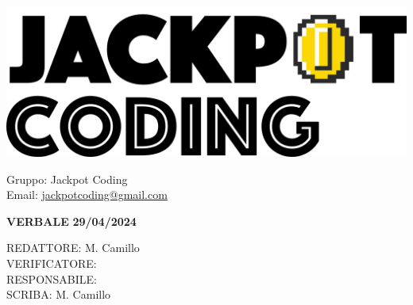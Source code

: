 \documentclass[5pt]{article}
\begin{document}
\begin{minipage}[t]{0.50\textwidth}
    \begin{flushleft}
        \hspace{10pt}
        \includegraphics[scale=0.65]{jackpot-logo.png} 
    \end{flushleft}
\end{minipage}
\hspace{-60pt} %
\begin{flushright}
    \begin{minipage}[t]{0.50\textwidth}
        \begin{flushright}
            Gruppo: {\Large Jackpot Coding}\\
            Email: \href{mailto:jackpotcoding@gmail.com}{jackpotcoding@gmail.com}
        \end{flushright}
    \end{minipage}
\end{flushright}

\vspace{20pt}

\begin{center}
    \textbf{\large VERBALE }
    \textbf{\large 29/04/2024} \\
\end{center}

\vspace{13pt}

\begin{flushleft}
    \begin{spacing}{1.5}
        REDATTORE: M. Camillo\\ 
        VERIFICATORE: \\ 
        RESPONSABILE: \\ 
        \vspace{7pt}
        SCRIBA: M. Camillo\\ 
    \end{spacing}
\end{flushleft}
\end{document}
